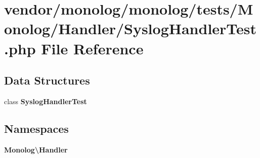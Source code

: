 \section{vendor/monolog/monolog/tests/\+Monolog/\+Handler/\+Syslog\+Handler\+Test.php File Reference}
\label{_syslog_handler_test_8php}
\subsection*{Data Structures}
\begin{DoxyCompactItemize}
\item 
class {\bf Syslog\+Handler\+Test}
\end{DoxyCompactItemize}
\subsection*{Namespaces}
\begin{DoxyCompactItemize}
\item 
 {\bf Monolog\textbackslash{}\+Handler}
\end{DoxyCompactItemize}
